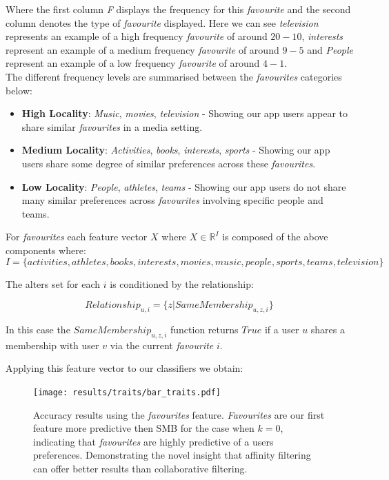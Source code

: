 Where the first column \emph{F} displays the frequency for this \emph{favourite} and the second column denotes the type of \emph{favourite} displayed. 
Here we can see \emph{television} represents an example of a high frequency \emph{favourite} of around $20-10$, \emph{interests} represent an example of a 
medium frequency \emph{favourite} of around $9-5$ and \emph{People} represent an example of a low frequency \emph{favourite} of around $4-1$.
\\ 

The different frequency levels are summarised between the \emph{favourites} categories below:
\begin{itemize}
\item \textbf{High Locality}: \emph{Music}, \emph{movies}, \emph{television} - Showing our app users appear to share similar \emph{favourites} in a media 
setting.
\item \textbf{Medium Locality}: \emph{Activities}, \emph{books}, \emph{interests}, \emph{sports} - Showing our app users share some degree of similar preferences 
across these \emph{favourites}.
\item \textbf{Low Locality}: \emph{People}, \emph{athletes}, \emph{teams} - Showing our app users do not share many similar preferences  
across \emph{favourites} involving specific people and teams.
\end{itemize}

For \emph{favourites} each feature vector $X$ where $X \in \mathbb{R}^I$ is composed of the above components where:
\[ I = \{activities, athletes, books, interests, movies, music, people, sports, teams, television\} \]

The alters set for each $i$ is conditioned by the relationship:

\[ Relationship_{u,i} = \{z | SameMembership_{u,z,i}\} \]

In this case the $SameMembership_{u,z,i}$ function returns $True$ if a user $u$ shares a membership with user $v$ via the current \emph{favourite} $i$.

Applying this feature vector to our classifiers we obtain:

\begin{figure}[h]
	\begin{center}
		\texttt{[image: results/traits/bar\_traits.pdf]}
		\caption{Accuracy results using the \emph{favourites} feature. \emph{Favourites} are our first feature more predictive then SMB
				 for the case when $k=0$, indicating that \emph{favourites} are highly predictive of a users preferences. Demonstrating the 
		novel insight that affinity filtering can offer better results than collaborative filtering.}
	\end{center}
\end{figure}

